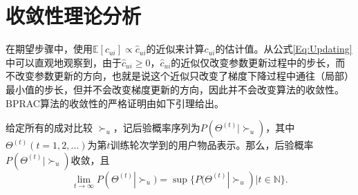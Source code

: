 \section{收敛性理论分析}\label{Sec:Convergence}
在期望步骤中，使用$\mathbb{E}[c_{ui}] \propto \hat{c}_{ui}$的近似来计算$c_{ui}$的估计值。从公式\eqref{Eq:Updating}中可以直观地观察到，由于$\hat{c}_{ui} \ge 0$，$\hat{c}_{ui}$的近似仅改变参数更新过程中的步长，而不改变参数更新的方向，也就是说这个近似只改变了梯度下降过程中通往（局部）最小值的步长，但并不会改变梯度更新的方向，因此并不会改变算法的收敛性。BPRAC算法的收敛性的严格证明由如下引理给出。
\begin{lemma}\label{Lemma:ConvergenceAnalysis}
给定所有的成对比较 ${\succ _u}$，记后验概率序列为$P(\Theta^{(t)} |\succ_u)$，其中${\Theta ^{(t)}}(t=1,2,...)$为第$t$训练轮次学到的用户物品表示。那么，后验概率${P(\Theta ^{(t)}|\succ_u)}$收敛，且
	\begin{equation}\label{Eq:PosteriorSupremum}
		\mathop {\lim }\limits_{t \to \infty } P({\Theta ^{(t)}}|{ \succ _u}) = \sup \{ P({\Theta ^{(t)}}|{ \succ _u}) | t \in \mathbb{N}\}.
	\end{equation}
\end{lemma}

